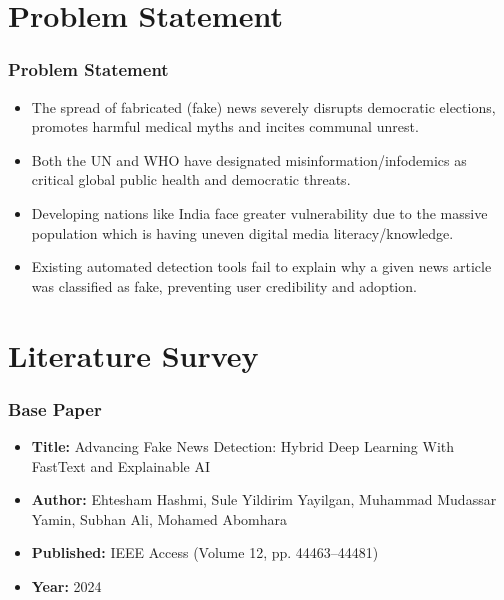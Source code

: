 \documentclass{beamer}
\begin{document}
\section{Problem Statement}
\begin{frame}
\frametitle{Problem Statement}
\large{
\begin{itemize}
    \item The spread of fabricated (fake) news severely disrupts democratic elections, promotes harmful medical myths and incites communal unrest.
    \item Both the UN and WHO have designated misinformation/infodemics as critical global public health and democratic threats.
    \item Developing nations like India face greater vulnerability due to the massive population which is having uneven digital media literacy/knowledge.
    \item Existing automated detection tools fail to explain why a given news article was classified as fake, preventing user credibility and adoption.
\end{itemize}
}
\end{frame}

\section{Literature Survey}

\begin{frame}
\frametitle{Base Paper}
\large{
\begin{itemize}
    \item \textbf{Title:} Advancing Fake News Detection: Hybrid Deep Learning With FastText and Explainable AI
    \item \textbf{Author:} Ehtesham Hashmi, Sule Yildirim Yayilgan, Muhammad Mudassar Yamin, Subhan Ali, Mohamed Abomhara
    \item \textbf{Published:} IEEE Access (Volume 12, pp. 44463--44481)
    \item \textbf{Year:} 2024
\end{itemize}
}
\end{frame}
\end{document}
